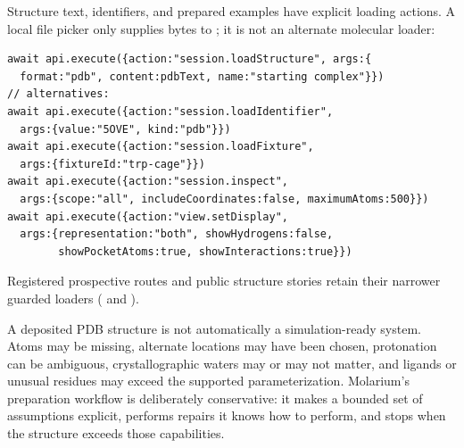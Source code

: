 \documentclass[11pt]{article}
\begin{document}
Structure text, identifiers, and prepared examples have explicit loading actions. A local file picker only supplies bytes to ; it is not an alternate molecular loader:

\begin{lstlisting}
await api.execute({action:"session.loadStructure", args:{
  format:"pdb", content:pdbText, name:"starting complex"}})
// alternatives:
await api.execute({action:"session.loadIdentifier",
  args:{value:"5OVE", kind:"pdb"}})
await api.execute({action:"session.loadFixture",
  args:{fixtureId:"trp-cage"}})
await api.execute({action:"session.inspect",
  args:{scope:"all", includeCoordinates:false, maximumAtoms:500}})
await api.execute({action:"view.setDisplay",
  args:{representation:"both", showHydrogens:false,
        showPocketAtoms:true, showInteractions:true}})
\end{lstlisting}

Registered prospective routes and public structure stories retain their narrower guarded loaders ( and ).


A deposited PDB structure is not automatically a simulation-ready system. Atoms may be missing, alternate locations may have been chosen, protonation can be ambiguous, crystallographic waters may or may not matter, and ligands or unusual residues may exceed the supported parameterization. Molarium's preparation workflow is deliberately conservative: it makes a bounded set of assumptions explicit, performs repairs it knows how to perform, and stops when the structure exceeds those capabilities.

\end{document}
